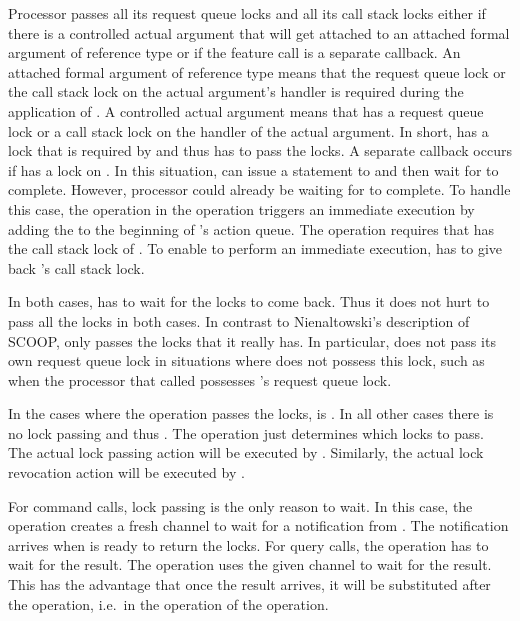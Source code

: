 \begin{clarification}
Processor  passes all its request queue locks and all its call stack locks either if there is a controlled actual argument that will get attached to an attached formal argument of reference type or if the feature call is a separate callback. An attached formal argument of reference type means that the request queue lock or the call stack lock on the actual argument's handler is required during the application of . A controlled actual argument means that  has a request queue lock or a call stack lock on the handler of the actual argument. In short,  has a lock that is required by  and thus  has to pass the locks. A separate callback occurs if  has a lock on . In this situation,  can issue a statement to  and then wait for  to complete. However, processor  could already be waiting for  to complete. To handle this case, the  operation in the  operation triggers an immediate execution by adding the  to the beginning of 's action queue. The  operation requires that  has the call stack lock of . To enable  to perform an immediate execution,  has to give back 's call stack lock.

In both cases,  has to wait for the locks to come back. Thus it does not hurt to pass all the locks in both cases. In contrast to Nienaltowski's \cite{nienaltowski:2007:SCOOP} description of SCOOP,  only passes the locks that it really has. In particular,  does not pass its own request queue lock in situations where  does not possess this lock, such as when the processor that called  possesses 's request queue lock.
\end{clarification}

In the cases where the operation passes the locks,  is . In all other cases there is no lock passing and thus . The operation just determines which locks to pass. The actual lock passing action will be executed by . Similarly, the actual lock revocation action will be executed by .

For command calls, lock passing is the only reason to wait. In this case, the operation creates a fresh channel  to wait for a notification from . The notification arrives when  is ready to return the locks. For query calls, the operation has to wait for the result. The operation uses the given channel  to wait for the result. This has the advantage that once the result arrives, it will be substituted after the  operation, i.e.\ in the  operation of the  operation.

